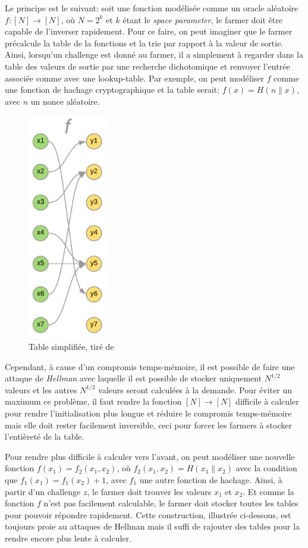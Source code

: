\documentclass[../tb_report.tex]{subfiles}
\begin{document}
Le principe est le suivant: soit une fonction modélisée comme un oracle aléatoire $f: [N] \rightarrow [N]$, où $N=2^k$ et $k$ étant le \emph{space parameter}, le farmer doit être capable de l'inverser rapidement. Pour ce faire, on peut imaginer que le farmer précalcule la table de la fonctions et la trie par rapport à la valeur de sortie. Ainsi, lorsqu'un challenge est donné au farmer, il a simplement à regarder dans la table des valeurs de sortie par une recherche dichotomique et renvoyer l'entrée associée comme avec une lookup-table. Par exemple, on peut modéliser $f$ comme une fonction de hachage cryptographique et la table serait: $f(x) = H(n\|x)$, avec $n$ un nonce aléatoire. \cite{chia:construction}

\begin{figure}[H]
  \centering
  \includegraphics[width=3.5cm]{images/pospace_1.png}
  \caption{Table simplifiée, tiré de \cite{chia:construction}}
\end{figure}

Cependant, à cause d'un compromis temps-mémoire, il est possible de faire une attaque de \emph{Hellman} avec laquelle il est possible de stocker uniquement $N^{1/2}$ valeurs et les autres $N^{1/2}$ valeurs seront calculées à la demande. Pour éviter un maximum ce problème, il faut rendre la fonction $[N] \rightarrow [N]$ difficile à calculer pour rendre l'initialisation plus longue et réduire le compromis temps-mémoire mais elle doit rester facilement inversible, ceci pour forcer les farmers à stocker l'entièreté de la table. \cite{chia:construction}

Pour rendre plus difficile à calculer vers l'avant, on peut modéliser une nouvelle fonction $f(x_1)=f_2(x_1,x_2)$, où $f_2(x_1,x_2)=H(x_1\|x_2)$ avec la condition que $f_1(x_1)=f_1(x_2)+1$, avec $f_1$ une autre fonction de hachage. Ainsi, à partir d'un challenge $z$, le farmer doit trouver les valeurs $x_1$ et $x_2$. Et comme la fonction $f$ n'est pas facilement calculable, le farmer doit stocker toutes les tables pour pouvoir répondre rapidement. Cette construction, illustrée ci-dessous, est toujours proie au attaques de Hellman mais il suffi de rajouter des tables pour la rendre encore plus lente à calculer. \cite{chia:construction}
\end{document}
